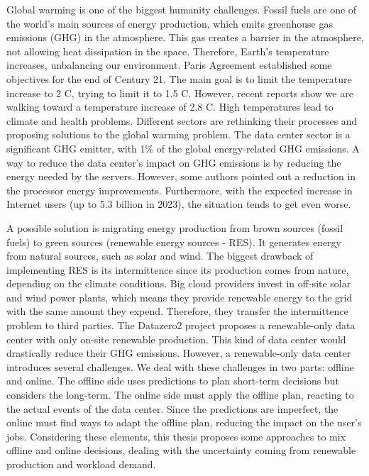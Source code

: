 Global warming is one of the biggest humanity challenges. Fossil fuels are one of the world's main sources of energy production, which emits greenhouse gas emissions (GHG) in the atmosphere. This gas creates a barrier in the atmosphere, not allowing heat dissipation in the space. Therefore, Earth's temperature increases, unbalancing our environment. Paris Agreement established some objectives for the end of Century 21. The main goal is to limit the temperature increase to 2 \degree C, trying to limit it to 1.5 \degree C. However, recent reports show we are walking toward a temperature increase of 2.8 \degree C. High temperatures lead to climate and health problems. Different sectors are rethinking their processes and proposing solutions to the global warming problem. The data center sector is a significant GHG emitter, with 1\% of the global energy-related GHG emissions. A way to reduce the data center's impact on GHG emissions is by reducing the energy needed by the servers. However, some authors pointed out a reduction in the processor energy improvements. Furthermore, with the expected increase in Internet users (up to 5.3 billion in 2023), the situation tends to get even worse. 

A possible solution is migrating energy production from brown sources (fossil fuels) to green sources (renewable energy sources - RES). It generates energy from natural sources, such as solar and wind. The biggest drawback of implementing RES is its intermittence since its production comes from nature, depending on the climate conditions. Big cloud providers invest in off-site solar and wind power plants, which means they provide renewable energy to the grid with the same amount they expend. Therefore, they transfer the intermittence problem to third parties. The Datazero2 project proposes a renewable-only data center with only on-site renewable production. This kind of data center would drastically reduce their GHG emissions. However, a renewable-only data center introduces several challenges. We deal with these challenges in two parts: offline and online. The offline side uses predictions to plan short-term decisions but considers the long-term. The online side must apply the offline plan, reacting to the actual events of the data center. Since the predictions are imperfect, the online must find ways to adapt the offline plan, reducing the impact on the user's jobs. Considering these elements, this thesis proposes some approaches to mix offline and online decisions, dealing with the uncertainty coming from renewable production and workload demand.

